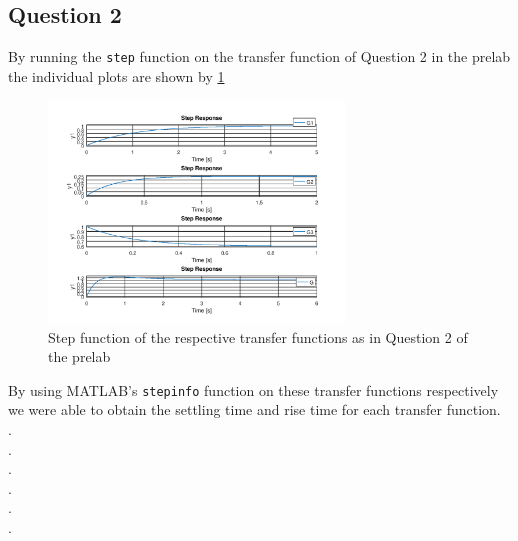 \documentclass[12pt, a4paper]{article}
\begin{document}
		\subsection{Question 2} %
		\label{sub:question_2}
		By running the \texttt{step} function on the transfer function of Question 2 in the prelab the individual plots are shown by \ref{fig:question_2_lab}

		\begin{figure}[H]
			\centering
			\includegraphics[width=0.7\textwidth]{Images/question_2_lab.png}
			\caption{Step function of the respective transfer functions as in Question 2 of the prelab}
			\label{fig:question_2_lab} 
		\end{figure}

		By using MATLAB's \texttt{stepinfo} function on these transfer functions respectively we were able to obtain the  settling time and rise time for each transfer function. \\
		.\\
		.\\
		.\\
		.\\
		.\\
		.\\

		
		
\end{document}
